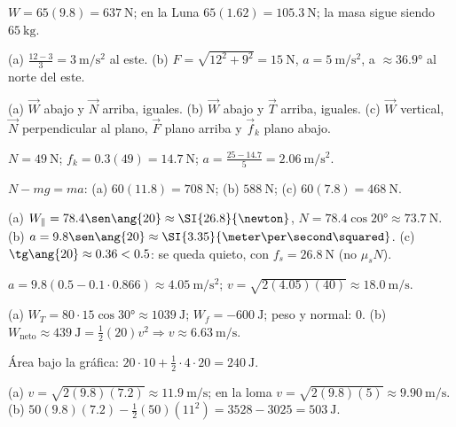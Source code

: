 \documentclass[11pt,a4paper]{article}
\begin{document}
\respuestas
\begin{respuestascortas}
\begin{soluciones}
\item $W=65(9.8)=\SI{637}{\newton}$; en la Luna $65(1.62)=\SI{105.3}{\newton}$; la masa sigue siendo $\SI{65}{\kilo\gram}$.
\item (a) $\frac{12-3}{3}=\SI{3}{\meter\per\second\squared}$ al este. (b) $F=\sqrt{12^2+9^2}=\SI{15}{\newton}$,
  $a=\SI{5}{\meter\per\second\squared}$, a $\approx\ang{36.9}$ al norte del este.
\item (a) $\vec W$ abajo y $\vec N$ arriba, iguales. (b) $\vec W$ abajo y $\vec T$ arriba, iguales. (c) $\vec W$ vertical,
  $\vec N$ perpendicular al plano, $\vec F$ plano arriba y $\vec f_k$ plano abajo.
\item $N=\SI{49}{\newton}$; $f_k=0.3(49)=\SI{14.7}{\newton}$; $a=\frac{25-14.7}{5}=\SI{2.06}{\meter\per\second\squared}$.
\item $N-mg=ma$: (a) $60(11.8)=\SI{708}{\newton}$; (b) $\SI{588}{\newton}$; (c) $60(7.8)=\SI{468}{\newton}$.
\item (a) $W_\parallel=78.4\sen\ang{20}\approx\SI{26.8}{\newton}$, $N=78.4\cos\ang{20}\approx\SI{73.7}{\newton}$.
  (b) $a=9.8\sen\ang{20}\approx\SI{3.35}{\meter\per\second\squared}$. (c) $\tg\ang{20}\approx0.36<0.5$: se queda quieto,
  con $f_s=\SI{26.8}{\newton}$ (no $\mu_sN$).
\item $a=9.8(0.5-0.1\cdot0.866)\approx\SI{4.05}{\meter\per\second\squared}$; $v=\sqrt{2(4.05)(40)}\approx\SI{18.0}{\meter\per\second}$.
\item (a) $W_T=80\cdot15\cos\ang{30}\approx\SI{1039}{\joule}$; $W_f=-\SI{600}{\joule}$; peso y normal: $0$.
  (b) $W_{\text{neto}}\approx\SI{439}{\joule}=\tfrac12(20)v^2\Rightarrow v\approx\SI{6.63}{\meter\per\second}$.
\item Área bajo la gráfica: $20\cdot10+\tfrac12\cdot4\cdot20=\SI{240}{\joule}$.
\item (a) $v=\sqrt{2(9.8)(7.2)}\approx\SI{11.9}{\meter\per\second}$; en la loma $v=\sqrt{2(9.8)(5)}\approx\SI{9.90}{\meter\per\second}$.
  (b) $50(9.8)(7.2)-\tfrac12(50)(11^2)=3528-3025=\SI{503}{\joule}$.
\end{soluciones}
\end{respuestascortas}
\end{document}
